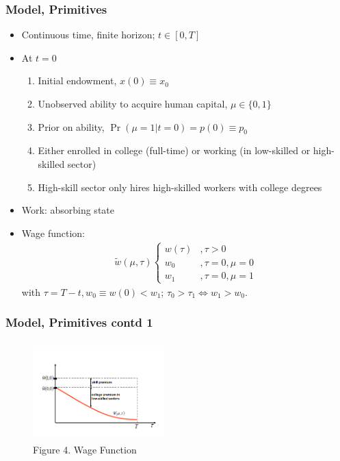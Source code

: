 \begin{frame}
	\frametitle{Model, Primitives}
		\begin{itemize}
			\item Continuous time, finite horizon; $t \in [0,T]$
			\item At $t=0$
				\begin{enumerate}
					\item Initial endowment, $x(0) \equiv x_{0}$
					\item Unobserved ability to acquire human capital, $\mu \in \{0,1\}$
					\item Prior on ability, $\Pr(\mu = 1 | t = 0) = p(0) \equiv p_{0}$
					\item Either enrolled in college (full-time) or working (in low-skilled or high-skilled sector)
					\item High-skill sector only hires high-skilled workers with college degrees
				\end{enumerate}
			\item Work: absorbing state
			\item Wage function:
				\begin{eqnarray}
						\tilde{w} \left( \mu, \tau \right)
							\begin{cases}
								w(\tau) &,  \tau > 0 \\
								w_{0}    &,  \tau = 0, \mu = 0 \\
								w_{1}   &,  \tau = 0, \mu = 1 
							\end{cases} 
				\end{eqnarray}
\noindent with $\tau = T - t, w_{0} \equiv w(0) < w_{1}$; $\tau_{0} > \tau_{1} \Leftrightarrow w_{1} > w_{0}$. 
		\end{itemize}
\end{frame}

\begin{frame}
	\frametitle{Model, Primitives contd 1}
		\begin{figure}[H] 
		\caption*{Figure 4. Wage Function}
		\centering
		\includegraphics[width=2in, height=1.5in]{Figures/OT/figure4.png}
		\end{figure}
\end{frame}

